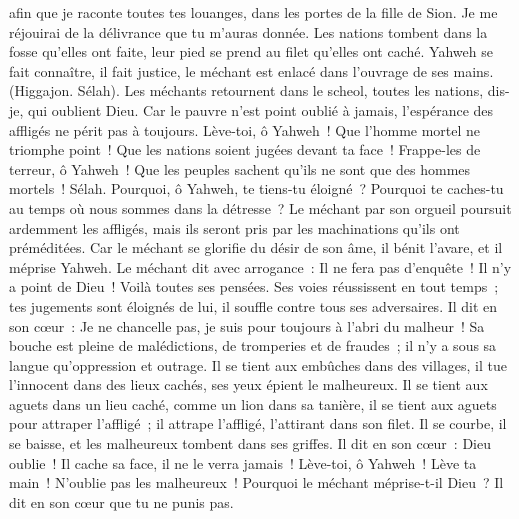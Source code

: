 \begin{multicols}{2}
afin que je raconte toutes tes louanges, dans les portes de la fille de Sion. Je me réjouirai de la délivrance que tu m'auras donnée.
Les nations tombent dans la fosse qu'elles ont faite, leur pied se prend au filet qu'elles ont caché.
Yahweh se fait connaître, il fait justice, le méchant est enlacé dans l'ouvrage de ses mains. (Higgajon. Sélah).
Les méchants retournent dans le scheol, toutes les nations, dis-je, qui oublient Dieu.
Car le pauvre n'est point oublié à jamais, l'espérance des affligés ne périt pas à toujours.
Lève-toi, ô Yahweh~! Que l'homme mortel ne triomphe point~! Que les nations soient jugées devant ta face~!
Frappe-les de terreur, ô Yahweh~! Que les peuples sachent qu'ils ne sont que des hommes mortels~! Sélah.
\VerseOne{}Pourquoi, ô Yahweh, te tiens-tu éloigné~? Pourquoi te caches-tu au temps où nous sommes dans la détresse~?
Le méchant par son orgueil poursuit ardemment les affligés, mais ils seront pris par les machinations qu'ils ont préméditées.
Car le méchant se glorifie du désir de son âme, il bénit l'avare, et il méprise Yahweh.
Le méchant dit avec arrogance~: Il ne fera pas d'enquête~! Il n'y a point de Dieu~! Voilà toutes ses pensées.
Ses voies réussissent en tout temps~; tes jugements sont éloignés de lui, il souffle contre tous ses adversaires.
Il dit en son cœur~: Je ne chancelle pas, je suis pour toujours à l'abri du malheur~!
Sa bouche est pleine de malédictions, de tromperies et de fraudes~; il n'y a sous sa langue qu'oppression et outrage.
Il se tient aux embûches dans des villages, il tue l'innocent dans des lieux cachés, ses yeux épient le malheureux.
Il se tient aux aguets dans un lieu caché, comme un lion dans sa tanière, il se tient aux aguets pour attraper l'affligé~; il attrape l'affligé, l'attirant dans son filet.
Il se courbe, il se baisse, et les malheureux tombent dans ses griffes.
Il dit en son cœur~: Dieu oublie~! Il cache sa face, il ne le verra jamais~!
Lève-toi, ô Yahweh~! Lève ta main~! N'oublie pas les malheureux~!
Pourquoi le méchant méprise-t-il Dieu~? Il dit en son cœur que tu ne punis pas.

\end{multicols}
